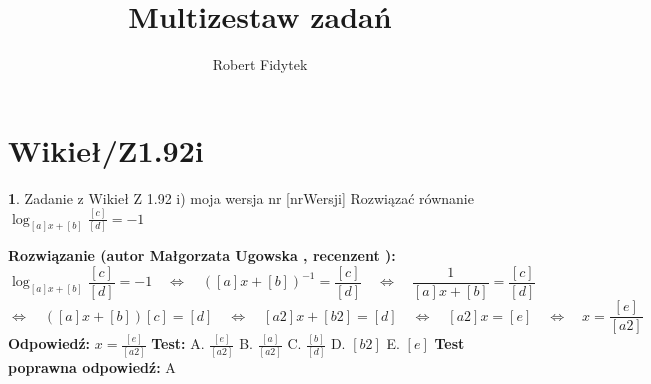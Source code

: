 \documentclass[12pt, a4paper]{article}
\title{Multizestaw zadań}
\author{Robert Fidytek}
\date{}
\theoremstyle{definition} %
\newtheorem{zad}{}
\newcommand{\kategoria}[1]{\section{#1}} %
\newcommand{\zadStart}[1]{\begin{zad}#1\newline} %
\newcommand{\zadStop}{\end{zad}}   %
\newcommand{\rozwStart}[2]{\noindent \textbf{Rozwiązanie (autor #1 , recenzent #2): }\newline} %
\newcommand{\rozwStop}{\newline}                                            %
\newcommand{\odpStart}{\noindent \textbf{Odpowiedź:}\newline}    %
\newcommand{\odpStop}{\newline}                                             %
\newcommand{\testStart}{\noindent \textbf{Test:}\newline} %
\newcommand{\testStop}{\newline} %
\newcommand{\kluczStart}{\noindent \textbf{Test poprawna odpowiedź:}\newline} %
\newcommand{\kluczStop}{\newline} %
\begin{document}
\maketitle


\kategoria{Wikieł/Z1.92i}
\zadStart{Zadanie z Wikieł Z 1.92 i) moja wersja nr [nrWersji]}
Rozwiązać równanie $\log_{[a]x+[b]}{\frac{[c]}{[d]}}=-1$
\zadStop
\rozwStart{Małgorzata Ugowska}{}
$$\log_{[a]x+[b]}{\frac{[c]}{[d]}}=-1 \quad \Longleftrightarrow \quad {([a]x+[b])}^{-1}=\frac{[c]}{[d]} \quad \Longleftrightarrow \quad \frac{1}{[a]x+[b]}=\frac{[c]}{[d]}$$
$$\Longleftrightarrow \quad ([a]x+[b])[c]=[d] \quad \Longleftrightarrow \quad [a2]x+[b2]=[d] \quad \Longleftrightarrow \quad [a2]x=[e] \quad \Longleftrightarrow \quad x=\frac{[e]}{[a2]}$$
\rozwStop
\odpStart
$x=\frac{[e]}{[a2]}$
\odpStop
\testStart
A. $\frac{[e]}{[a2]}$
B. $\frac{[a]}{[a2]}$
C. $\frac{[b]}{[d]}$
D. $[b2]$
E. $[e]$
\testStop
\kluczStart
A
\kluczStop
\end{document}
